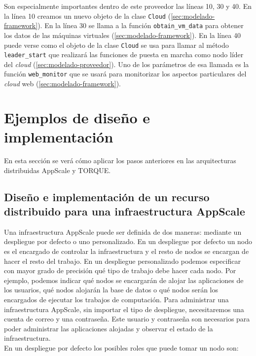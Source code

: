 Son especialmente importantes dentro de este proveedor las líneas 10, 30 y 40. En la línea 10 creamos un nuevo objeto de la clase \texttt{Cloud} (\ref{sec:modelado-framework}). En la línea 30 se llama a la función \texttt{obtain\_vm\_data} para obtener los datos de las máquinas virtuales (\ref{sec:modelado-framework}). En la línea 40 puede verse como el objeto de la clase \texttt{Cloud} se usa para llamar al método \texttt{leader\_start} que realizará las funciones de puesta en marcha como nodo líder del \emph{cloud} (\ref{sec:modelado-proveedor}). Uno de los parámetros de esa llamada es la función \texttt{web\_monitor} que se usará para monitorizar los aspectos particulares del \emph{cloud} web (\ref{sec:modelado-framework}).


\section{Ejemplos de diseño e implementación}

En esta sección se verá cómo aplicar los pasos anteriores en las arquitecturas distribuidas AppScale y TORQUE.

\subsection{Diseño e implementación de un recurso distribuido para una infraestructura AppScale}

Una infraestructura AppScale puede ser definida de dos maneras: mediante un despliegue por defecto o uno personalizado. En un despliegue por defecto un nodo es el encargado de controlar la infraestructura y el resto de nodos se encargan de hacer el resto del trabajo. En un despliegue personalizado podemos especificar con mayor grado de precisión qué tipo de trabajo debe hacer cada nodo. Por ejemplo, podemos indicar qué nodos se encargarán de alojar las aplicaciones de los usuarios, qué nodos alojarán la base de datos o qué nodos serán los encargados de ejecutar los trabajos de computación. Para administrar una infraestructura AppScale, sin importar el tipo de despliegue, necesitaremos una cuenta de correo y una contraseña. Este usuario y contraseña son necesarios para poder administrar las aplicaciones alojadas y observar el estado de la infraestructura. \\

En un despliegue por defecto los posibles roles que puede tomar un nodo son:

